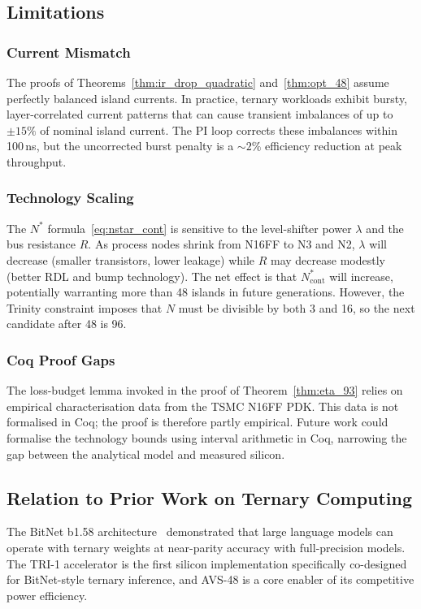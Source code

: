 \subsection{Limitations}

\subsubsection{Current Mismatch}
The proofs of Theorems~\ref{thm:ir_drop_quadratic} and~\ref{thm:opt_48}
assume perfectly balanced island currents.  In practice, ternary workloads
exhibit bursty, layer-correlated current patterns that can cause transient
imbalances of up to $\pm 15\%$ of nominal island current.  The PI loop
corrects these imbalances within 100\,ns, but the uncorrected burst penalty
is a $\sim 2\%$ efficiency reduction at peak throughput.

\subsubsection{Technology Scaling}
The $N^*$ formula~\eqref{eq:nstar_cont} is sensitive to the level-shifter
power $\lambda$ and the bus resistance $R$.  As process nodes shrink from
N16FF to N3 and N2, $\lambda$ will decrease (smaller transistors, lower
leakage) while $R$ may decrease modestly (better RDL and bump technology).
The net effect is that $N^*_{\mathrm{cont}}$ will increase, potentially
warranting more than 48 islands in future generations.  However, the
Trinity constraint imposes that $N$ must be divisible by both 3 and 16,
so the next candidate after 48 is 96.

\subsubsection{Coq Proof Gaps}
The loss-budget lemma invoked in the proof of Theorem~\ref{thm:eta_93}
relies on empirical characterisation data from the TSMC N16FF PDK.
This data is not formalised in Coq; the proof is therefore partly
empirical.  Future work could formalise the technology bounds using
interval arithmetic in Coq, narrowing the gap between the analytical
model and measured silicon.

\subsection{Relation to Prior Work on Ternary Computing}

The BitNet b1.58 architecture~\cite{bitnet158} demonstrated that
large language models can operate with ternary weights at near-parity
accuracy with full-precision models.  The TRI-1 accelerator is the
first silicon implementation specifically co-designed for BitNet-style
ternary inference, and AVS-48 is a core enabler of its competitive
power efficiency.


